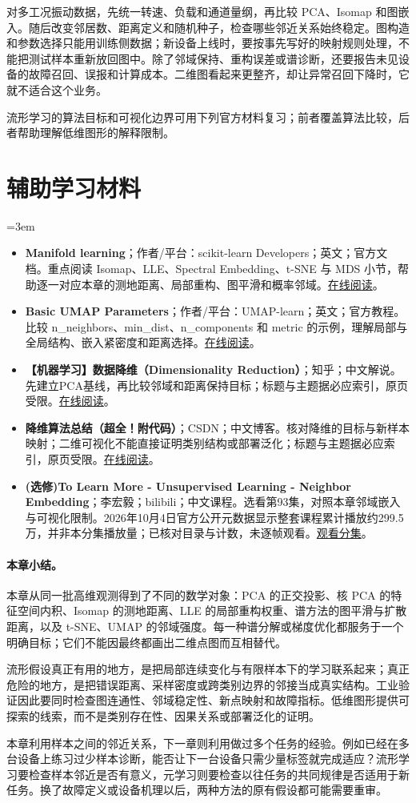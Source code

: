对多工况振动数据，先统一转速、负载和通道量纲，再比较 PCA、Isomap 和图嵌入。随后改变邻居数、距离定义和随机种子，检查哪些邻近关系始终稳定。图构造和参数选择只能用训练侧数据；新设备上线时，要按事先写好的映射规则处理，不能把测试样本重新放回图中。除了邻域保持、重构误差或谱诊断，还要报告未见设备的故障召回、误报和计算成本。二维图看起来更整齐，却让异常召回下降时，它就不适合这个业务。

流形学习的算法目标和可视化边界可用下列官方材料复习；前者覆盖算法比较，后者帮助理解低维图形的解释限制。
\section*{辅助学习材料}
\begingroup
\emergencystretch=3em
\begin{itemize}
\item \textbf{Manifold learning}；作者/平台：scikit-learn Developers；英文；官方文档。重点阅读 Isomap、LLE、Spectral Embedding、t-SNE 与 MDS 小节，帮助逐一对应本章的测地距离、局部重构、图平滑和概率邻域。\href{https://scikit-learn.org/stable/modules/manifold.html}{在线阅读}。
\item \textbf{Basic UMAP Parameters}；作者/平台：UMAP-learn；英文；官方教程。比较 n\_neighbors、min\_dist、n\_components 和 metric 的示例，理解局部与全局结构、嵌入紧密度和距离选择。\href{https://umap-learn.readthedocs.io/en/latest/parameters.html}{在线阅读}。
\item \textbf{【机器学习】数据降维（Dimensionality Reduction）}；知乎；中文解说。先建立PCA基线，再比较邻域和距离保持目标；标题与主题据必应索引，原页受限。\href{https://zhuanlan.zhihu.com/p/342129669}{在线阅读}。
\item \textbf{降维算法总结（超全！附代码）}；CSDN；中文博客。核对降维的目标与新样本映射；二维可视化不能直接证明类别结构或部署泛化；标题与主题据必应索引，原页受限。\href{https://blog.csdn.net/SeafyLiang/article/details/118701759}{在线阅读}。
\item \textbf{(选修)To Learn More - Unsupervised Learning - Neighbor Embedding}；李宏毅；bilibili；中文课程。选看第93集，对照本章邻域嵌入与可视化限制。2026年10月4日官方公开元数据显示整套课程累计播放约299.5万，并非本分集播放量；已核对目录与计数，未逐帧观看。\href{https://www.bilibili.com/video/BV1Wv411h7kN/?p=93}{观看分集}。
\end{itemize}
\endgroup
\paragraph{本章小结。}
本章从同一批高维观测得到了不同的数学对象：PCA 的正交投影、核 PCA 的特征空间内积、Isomap 的测地距离、LLE 的局部重构权重、谱方法的图平滑与扩散距离，以及 t-SNE、UMAP 的邻域强度。每一种谱分解或梯度优化都服务于一个明确目标；它们不能因最终都画出二维点图而互相替代。

流形假设真正有用的地方，是把局部连续变化与有限样本下的学习联系起来；真正危险的地方，是把错误距离、采样密度或跨类别边界的邻接当成真实结构。工业验证因此要同时检查图连通性、邻域稳定性、新点映射和故障指标。低维图形提供可探索的线索，而不是类别存在性、因果关系或部署泛化的证明。

本章利用样本之间的邻近关系，下一章则利用做过多个任务的经验。例如已经在多台设备上练习过少样本诊断，能否让下一台设备只需少量标签就完成适应？流形学习要检查样本邻近是否有意义，元学习则要检查以往任务的共同规律是否适用于新任务。换了故障定义或设备机理以后，两种方法的原有假设都可能需要重审。
